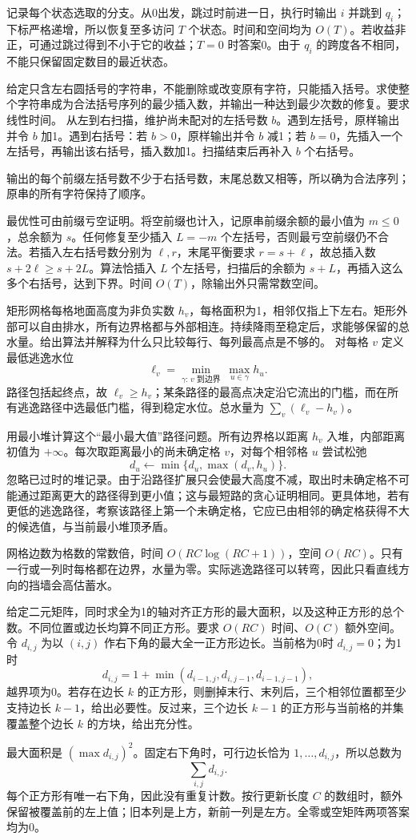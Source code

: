 记录每个状态选取的分支。从0出发，跳过时前进一日，执行时输出 $i$ 并跳到 $q_i$；下标严格递增，所以恢复至多访问 $T$ 个状态。时间和空间均为 $O(T)$。若收益非正，可通过跳过得到不小于它的收益；$T=0$ 时答案0。由于 $q_i$ 的跨度各不相同，不能只保留固定数目的最近状态。

给定只含左右圆括号的字符串，不能删除或改变原有字符，只能插入括号。求使整个字符串成为合法括号序列的最少插入数，并输出一种达到最少次数的修复。要求线性时间。
\solution 从左到右扫描，维护尚未配对的左括号数 $b$。遇到左括号，原样输出并令 $b$ 加1。遇到右括号：若 $b>0$，原样输出并令 $b$ 减1；若 $b=0$，先插入一个左括号，再输出该右括号，插入数加1。扫描结束后再补入 $b$ 个右括号。

输出的每个前缀左括号数不少于右括号数，末尾总数又相等，所以确为合法序列；原串的所有字符保持了顺序。

最优性可由前缀亏空证明。将空前缀也计入，记原串前缀余额的最小值为 $m\le0$，总余额为 $s$。任何修复至少插入 $L=-m$ 个左括号，否则最亏空前缀仍不合法。若插入左右括号数分别为 $\ell,r$，末尾平衡要求 $r=s+\ell$，故总插入数 $s+2\ell\ge s+2L$。算法恰插入 $L$ 个左括号，扫描后的余额为 $s+L$，再插入这么多个右括号，达到下界。时间 $O(T)$，除输出外只需常数空间。

矩形网格每格地面高度为非负实数 $h_v$，每格面积为1，相邻仅指上下左右。矩形外部可以自由排水，所有边界格都与外部相连。持续降雨至稳定后，求能够保留的总水量。给出算法并解释为什么只比较每行、每列最高点是不够的。
\solution 对每格 $v$ 定义最低逃逸水位
\[
\ell_v=\min_{\gamma:\,v\text{ 到边界}}\ \max_{u\in\gamma}h_u.
\]
路径包括起终点，故 $\ell_v\ge h_v$；某条路径的最高点决定沿它流出的门槛，而在所有逃逸路径中选最低门槛，得到稳定水位。总水量为 $\sum_v(\ell_v-h_v)$。

用最小堆计算这个“最小最大值”路径问题。所有边界格以距离 $h_v$ 入堆，内部距离初值为 $+\infty$。每次取距离最小的尚未确定格 $v$，对每个相邻格 $u$ 尝试松弛
\[
d_u\leftarrow\min\{d_u,\max(d_v,h_u)\}.
\]
忽略已过时的堆记录。由于沿路径扩展只会使最大高度不减，取出时未确定格不可能通过距离更大的路径得到更小值；这与最短路的贪心证明相同。更具体地，若有更低的逃逸路径，考察该路径上第一个未确定格，它应已由相邻的确定格获得不大的候选值，与当前最小堆顶矛盾。

网格边数为格数的常数倍，时间 $O(RC\log(RC+1))$，空间 $O(RC)$。只有一行或一列时每格都在边界，水量为零。实际逃逸路径可以转弯，因此只看直线方向的挡墙会高估蓄水。

给定二元矩阵，同时求全为1的轴对齐正方形的最大面积，以及这种正方形的总个数。不同位置或边长均算不同正方形。要求 $O(RC)$ 时间、$O(C)$ 额外空间。
\solution 令 $d_{i,j}$ 为以 $(i,j)$ 作右下角的最大全一正方形边长。当前格为0时 $d_{i,j}=0$；为1时
\[
d_{i,j}=1+\min(d_{i-1,j},d_{i,j-1},d_{i-1,j-1}),
\]
越界项为0。若存在边长 $k$ 的正方形，则删掉末行、末列后，三个相邻位置都至少支持边长 $k-1$，给出必要性。反过来，三个边长 $k-1$ 的正方形与当前格的并集覆盖整个边长 $k$ 的方块，给出充分性。

最大面积是 $(\max d_{i,j})^2$。固定右下角时，可行边长恰为 $1,\ldots,d_{i,j}$，所以总数为
\[
\sum_{i,j}d_{i,j}.
\]
每个正方形有唯一右下角，因此没有重复计数。按行更新长度 $C$ 的数组时，额外保留被覆盖前的左上值；旧本列是上方，新前一列是左方。全零或空矩阵两项答案均为0。
